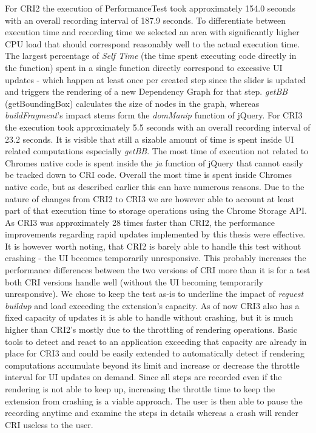 	For CRI2 the execution of PerformanceTest took approximately 154.0 seconds with an overall recording interval of 187.9 seconds. To differentiate between execution time and recording time we selected an area with significantly higher CPU load that should correspond reasonably well to the actual execution time. The largest percentage of \emph{Self Time} (the time spent executing code directly in the function) spent in a single function directly correspond to excessive UI updates - which happen at least once per created step since the slider is updated and triggers the rendering of a new Dependency Graph for that step. \emph{getBB} (getBoundingBox) calculates the size of nodes in the graph, whereas  \emph{buildFragment}'s impact stems form the \emph{domManip} function of jQuery.
	For CRI3 the execution took approximately 5.5 seconds with an overall recording interval of 23.2 seconds. It is visible that still a sizable amount of time is spent inside UI related computations especially \emph{getBB}. The most time of execution not related to Chromes native code is spent inside the \emph{ja} function of jQuery that cannot easily be tracked down to CRI code. Overall the most time is spent inside Chromes native code, but as described earlier this can have numerous reasons. Due to the nature of changes from CRI2 to CRI3 we are however able to account at least part of that execution time to storage operations using the Chrome Storage API. 
	As CRI3 was approximately 28 times faster than CRI2, the performance improvements regarding rapid updates implemented by this thesis were effective. It is however worth noting, that CRI2 is barely able to handle this test without crashing - the UI becomes temporarily unresponsive. This probably increases the performance differences between the two versions of CRI more than it is for a test both CRI versions handle well (without the UI becoming temporarily unresponsive). We chose to keep the test as-is to underline the impact of \emph{request buildup} and load exceeding the extension's capacity. 
	As of now CRI3 also has a fixed capacity of updates it is able to handle without crashing, but it is much higher than CRI2's mostly due to the throttling of rendering operations. Basic tools to detect and react to an application exceeding that capacity are already in place for CRI3 and could be easily extended to automatically detect if rendering computations accumulate beyond its limit and increase or decrease the throttle interval for UI updates on demand. Since all steps are recorded even if the rendering is not able to keep up, increasing the throttle time to keep the extension from crashing is a viable approach. The user is then able to pause the recording anytime and examine the steps in details whereas a crash will render CRI useless to the user.
	
